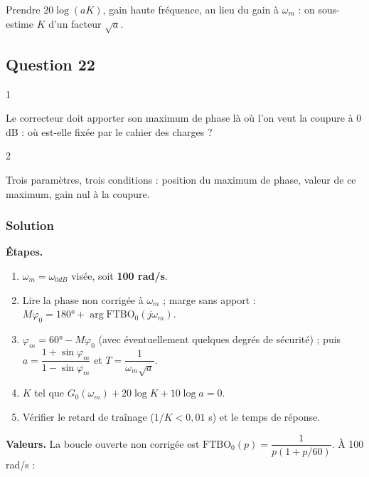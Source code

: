 \documentclass[11pt,a4paper]{article}
\providecommand{\tightlist}{\setlength{\itemsep}{0pt}\setlength{\parskip}{0pt}}
\begin{document}
\begin{piege}

Prendre \(20\log(aK)\), gain haute fréquence, au lieu du gain à \(\omega_m\) : on sous-estime \(K\) d'un facteur \(\sqrt a\).

\end{piege}

\hypertarget{question-22}{%
\subsection{Question 22}\label{question-22}}

\begin{indication}{1}

Le correcteur doit apporter son maximum de phase là où l'on veut la coupure à 0 dB : où est-elle fixée par le cahier des charges ?

\end{indication}

\begin{indication}{2}

Trois paramètres, trois conditions : position du maximum de phase, valeur de ce maximum, gain nul à la coupure.

\end{indication}

\hypertarget{solution-21}{%
\subsubsection{Solution}\label{solution-21}}

\textbf{Étapes.}

\begin{enumerate}
\def\labelenumi{\arabic{enumi}.}
\tightlist
\item
  \(\omega_m=\omega_{0dB}\) visée, soit \textbf{100 rad/s}.
\item
  Lire la phase non corrigée à \(\omega_m\) ; marge sans apport : \(M\varphi_0=180°+\arg{\mathrm{FTBO}}_0(j\omega_m)\).
\item
  \(\varphi_m=60°-M\varphi_0\) (avec éventuellement quelques degrés de sécurité) ; puis \(a=\dfrac{1+\sin\varphi_m}{1-\sin\varphi_m}\) et \(T=\dfrac1{\omega_m\sqrt a}\).
\item
  \(K\) tel que \(G_0(\omega_m)+20\log K+10\log a=0\).
\item
  Vérifier le retard de traînage (\(1/K<0{,}01\) s) et le temps de réponse.
\end{enumerate}

\textbf{Valeurs.} La boucle ouverte non corrigée est \({\mathrm{FTBO}}_0(p)=\dfrac{1}{p(1+p/60)}\). À 100 rad/s :
\end{document}
